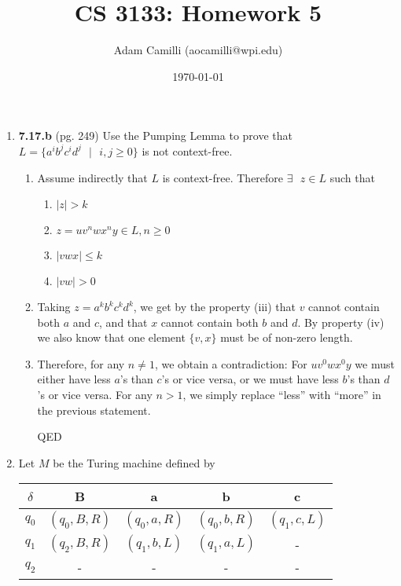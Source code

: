 \documentclass[12pt]{article}
\begin{document}
\title{CS 3133: Homework 5}
\author{Adam Camilli (aocamilli@wpi.edu)}
\date{\today}
\maketitle

\begin{enumerate}
  \item \textbf{7.17.b} (pg. 249) Use the Pumping Lemma to prove that $L = \{a^ib^jc^id^j \text{ }|\text{ } i,j \ge 0\}$ is not context-free. 
    \begin{enumerate}
      \item Assume indirectly that $L$ is context-free. Therefore $\exists \text{ }z \in L$ such that
        \begin{enumerate}
          \item $|z| > k$ 
          \item $z = uv^nwx^ny \in L, n \ge 0$
          \item $|vwx| \le k$
          \item $|vw| > 0$
        \end{enumerate}
      \item Taking $z = a^kb^kc^kd^k$, we get by the property (iii) that $v$ cannot contain both $a$ and $c$, and that $x$ cannot contain both $b$ and $d$. By property (iv) we also know that one element $\{v,x\}$ must be of non-zero length.
      \item Therefore, for any $n \neq 1$, we obtain a contradiction: For $uv^0wx^0y$ we must either have less $a$'s than $c$'s or vice versa, or we must have less $b$'s than $d$'s or vice versa. For any $n > 1$, we simply replace ``less'' with ``more'' in the previous statement. 
        \begin{center}QED
        \end{center}
    \end{enumerate}
\newpage
  \item Let $M$ be the Turing machine defined by
    \begin{center}
      \begin{tabular}{c|cccc}
        $\delta$ & B & a & b & c \\
        \hline
        $q_0$ & $(q_0, B, R)$ & $(q_0, a, R)$ & $(q_0, b, R)$ & $(q_1, c, L)$ \\ 
        $q_1$ & $(q_2, B, R)$ & $(q_1, b, L)$ & $(q_1, a, L)$ & - \\ 
          $q_2$ & - & - & - & - \\ 
      \end{tabular}

\end{center}
\end{enumerate}
\end{document}
